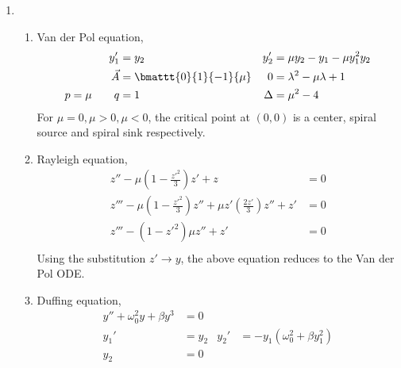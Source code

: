 \begin{enumerate}
    \item
          \begin{enumerate}
              \item Van der Pol equation,
                    \begin{align}
                        y_1'             & = y_2                             &
                        y_2'             & = \mu y_2 - y_1  -\mu y_1^{2} y_2   \\
                        \vec{A}          & = \bmattt{0}{1}{-1}{\mu}          &
                        0                & = \lambda^{2} - \mu\lambda + 1      \\
                        p = \mu \qquad q & = 1                               &
                        \Delta           & = \mu^{2} - 4
                    \end{align}
                    For $ \mu = 0, \mu > 0, \mu< 0 $, the critical point at $ (0, 0) $
                    is a center, spiral source and spiral sink respectively.
              \item Rayleigh equation,
                    \begin{align}
                        z'' - \mu \left( 1 - \frac{z'^{2}}{3} \right) z' + z & = 0 \\
                        z''' - \mu\left( 1 - \frac{z'^2}{3} \right)z''
                        + \mu z' \left( \frac{2z'}{3} \right)z'' + z'        & = 0 \\
                        z''' - ( 1 - z'^2)\mu z''
                        + z'                                                 & = 0 \\
                    \end{align}
                    Using the substitution $ z' \rightarrow y $, the above equation
                    reduces to the Van der Pol ODE.
              \item Duffing equation,
                    \begin{align}
                        y'' + \omega_0^{2}y + \beta y^{3}  & = 0                                \\
                        y_1'                               & = y_2                            &
                        y_2'                               & = -y_1(\omega_0^{2}
                        + \beta y_1^{2})                                                        \\
                        y_2                                & = 0                              &

\end{align}
\end{enumerate}
\end{enumerate}
